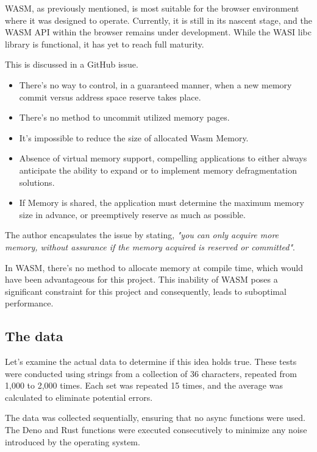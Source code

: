 \documentclass[10pt,journal,compsoc]{IEEEtran}
\begin{document}
WASM, as previously mentioned, is most suitable for the browser environment where it was designed to operate. Currently, it is still in its nascent stage, and the WASM API within the browser remains under development. While the WASI libc library is functional, it has yet to reach full maturity.

This is discussed in a GitHub issue. \cite{WASMBAD}

\begin{itemize}
    \item There's no way to control, in a guaranteed manner, when a new memory commit versus address space reserve takes place.
    \item There's no method to uncommit utilized memory pages.
    \item It's impossible to reduce the size of allocated Wasm Memory.
    \item Absence of virtual memory support, compelling applications to either always anticipate the ability to expand or to implement memory defragmentation solutions.
    \item If Memory is shared, the application must determine the maximum memory size in advance, or preemptively reserve as much as possible.
\end{itemize}

The author encapsulates the issue by stating, \textit{"you can only acquire more memory, without assurance if the memory acquired is reserved or committed"}.

In WASM, there's no method to allocate memory at compile time, which would have been advantageous for this project. This inability of WASM poses a significant constraint for this project and consequently, leads to suboptimal performance.

\subsection{The data}

Let's examine the actual data to determine if this idea holds true. These tests were conducted using strings from a collection of 36 characters, repeated from 1,000 to 2,000 times. Each set was repeated 15 times, and the average was calculated to eliminate potential errors.

The data was collected sequentially, ensuring that no async functions were used. The Deno and Rust functions were executed consecutively to minimize any noise introduced by the operating system.
\end{document}
